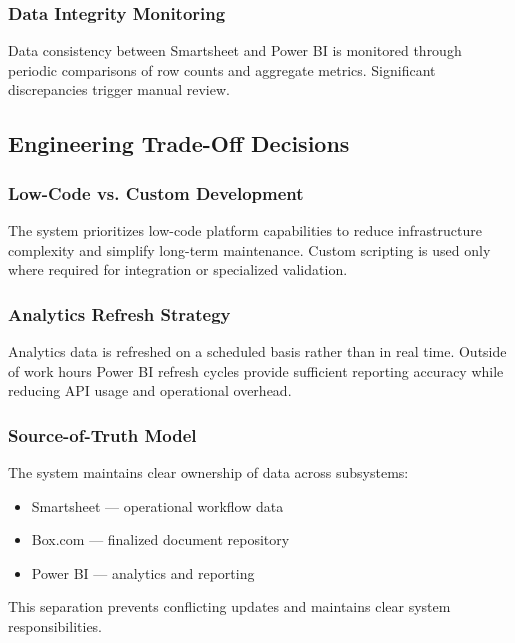 \documentclass[12pt]{article}
\begin{document}
\subsubsection{Data Integrity Monitoring}

Data consistency between Smartsheet and Power BI is monitored through periodic comparisons of row counts and aggregate metrics. Significant discrepancies trigger manual review.

\subsection{Engineering Trade-Off Decisions}

\subsubsection{Low-Code vs. Custom Development}

The system prioritizes low-code platform capabilities to reduce infrastructure complexity and simplify long-term maintenance. Custom scripting is used only where required for integration or specialized validation.

\subsubsection{Analytics Refresh Strategy}

Analytics data is refreshed on a scheduled basis rather than in real time. Outside of work hours Power BI refresh cycles provide sufficient reporting accuracy while reducing API usage and operational overhead.

\subsubsection{Source-of-Truth Model}

The system maintains clear ownership of data across subsystems:

\begin{itemize}[nosep]
    \item Smartsheet — operational workflow data
    \item Box.com — finalized document repository
    \item Power BI — analytics and reporting
\end{itemize}

This separation prevents conflicting updates and maintains clear system responsibilities.
\end{document}
